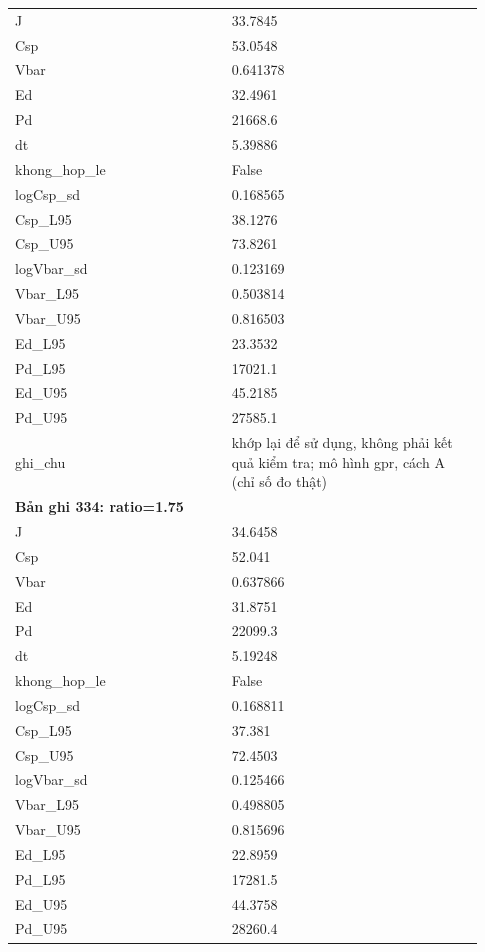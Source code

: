 \begin{longtable}{p{0.43\linewidth}p{0.50\linewidth}}
J & 33.7845 \\
Csp & 53.0548 \\
Vbar & 0.641378 \\
Ed & 32.4961 \\
Pd & 21668.6 \\
dt & 5.39886 \\
khong\_\allowbreak hop\_\allowbreak le & False \\
logCsp\_\allowbreak sd & 0.168565 \\
Csp\_\allowbreak L95 & 38.1276 \\
Csp\_\allowbreak U95 & 73.8261 \\
logVbar\_\allowbreak sd & 0.123169 \\
Vbar\_\allowbreak L95 & 0.503814 \\
Vbar\_\allowbreak U95 & 0.816503 \\
Ed\_\allowbreak L95 & 23.3532 \\
Pd\_\allowbreak L95 & 17021.1 \\
Ed\_\allowbreak U95 & 45.2185 \\
Pd\_\allowbreak U95 & 27585.1 \\
ghi\_\allowbreak chu & khớp lại để sử dụng, không phải kết quả kiểm tra; mô hình gpr, cách A (chỉ số đo thật) \\
\midrule
\multicolumn{2}{p{0.95\linewidth}}{\textbf{Bản ghi 334: ratio=1.75}} \\
J & 34.6458 \\
Csp & 52.041 \\
Vbar & 0.637866 \\
Ed & 31.8751 \\
Pd & 22099.3 \\
dt & 5.19248 \\
khong\_\allowbreak hop\_\allowbreak le & False \\
logCsp\_\allowbreak sd & 0.168811 \\
Csp\_\allowbreak L95 & 37.381 \\
Csp\_\allowbreak U95 & 72.4503 \\
logVbar\_\allowbreak sd & 0.125466 \\
Vbar\_\allowbreak L95 & 0.498805 \\
Vbar\_\allowbreak U95 & 0.815696 \\
Ed\_\allowbreak L95 & 22.8959 \\
Pd\_\allowbreak L95 & 17281.5 \\
Ed\_\allowbreak U95 & 44.3758 \\
Pd\_\allowbreak U95 & 28260.4 \\

\end{longtable}
